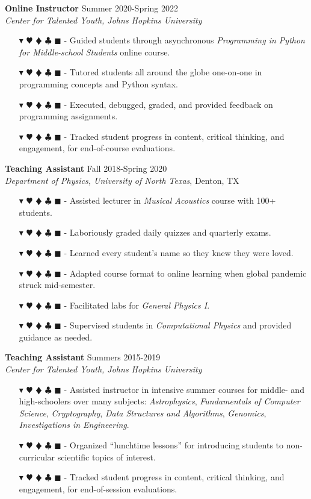 \documentclass[overlapped, 10pt]{res} %
\newcommand{\physics}{$\blacktriangledown$}
\newcommand{\biochem}{$\varheartsuit$}
\newcommand{\shannon}{$\vardiamondsuit$}
\newcommand{\classic}{$\clubsuit$}
\newcommand{\quantum}{$\blacksquare$}
\newcommand{\physicscolor}{\color{YellowOrange}}
\newcommand{\biochemcolor}{\color{Emerald}}
\newcommand{\shannoncolor}{\color{Goldenrod}}
\newcommand{\classiccolor}{\color{Cyan}}
\newcommand{\quantumcolor}{\color{RedOrange}}
\newcommand{\tag}[1]{
    {\IfSubStr{#1}{\physics}{\physicscolor}{\color{White}}\physics}
    {\IfSubStr{#1}{\biochem}{\biochemcolor}{\color{White}}\biochem}
    {\IfSubStr{#1}{\shannon}{\shannoncolor}{\color{White}}\shannon}
    {\IfSubStr{#1}{\classic}{\classiccolor}{\color{White}}\classic}
    {\IfSubStr{#1}{\quantum}{\quantumcolor}{\color{White}}\quantum}
}
\begin{document}
\begin{resume}
\textbf{Online Instructor} \hfill Summer 2020-Spring 2022 \\
\textit{Center for Talented Youth, Johns Hopkins University}
\begin{itemize} \itemsep -2pt %
\item[\tag{\classic}-] Guided students through asynchronous \textit{Programming in Python for Middle-school Students} online course.
\item[\tag{\classic}-] Tutored students all around the globe one-on-one in programming concepts and Python syntax.
\item[\tag{\classic}-] Executed, debugged, graded, and provided feedback on programming assignments.
\item[\tag{}-] Tracked student progress in content, critical thinking, and engagement, for end-of-course evaluations.
\end{itemize}

\textbf{Teaching Assistant} \hfill Fall 2018-Spring 2020 \\
\textit{Department of Physics, University of North Texas}, Denton, TX
\begin{itemize} \itemsep -2pt %
\item[\tag{\physics}-] Assisted lecturer in \textit{Musical Acoustics} course with 100+ students.
\item[\tag{}-] Laboriously graded daily quizzes and quarterly exams.
\item[\tag{}-] Learned every student's name so they knew they were loved.
\item[\tag{}-] Adapted course format to online learning when global pandemic struck mid-semester.
\item[\tag{\physics}-] Facilitated labs for \textit{General Physics I}.
\item[\tag{\physics\classic}-] Supervised students in \textit{Computational Physics} and provided guidance as needed.
\end{itemize}

\textbf{Teaching Assistant} \hfill Summers 2015-2019 \\
\textit{Center for Talented Youth, Johns Hopkins University}
\begin{itemize} \itemsep -2pt %
\item[\tag{\physics\biochem\shannon\classic}-] Assisted instructor in intensive summer courses for middle- and high-schoolers over many subjects: \textit{Astrophysics}, \textit{Fundamentals of Computer Science}, \textit{Cryptography}, \textit{Data Structures and Algorithms}, \textit{Genomics}, \textit{Investigations in Engineering}.
\item[\tag{\physics\biochem\shannon\classic\quantum}-] Organized ``lunchtime lessons'' for introducing students to non-curricular scientific topics of interest.
\item[\tag{}-] Tracked student progress in content, critical thinking, and engagement, for end-of-session evaluations.
\end{itemize}


\end{resume}
\end{document}
